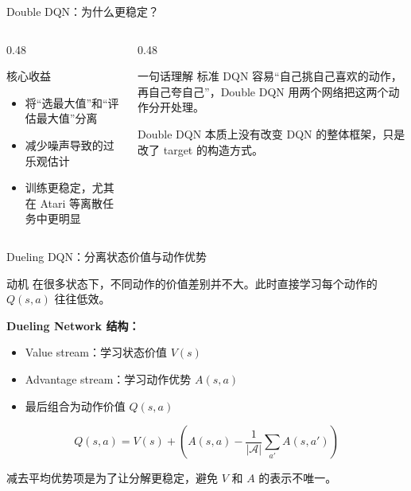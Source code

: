 \documentclass{beamer}
\begin{document}
\begin{frame}{Double DQN：为什么更稳定？}
    \begin{columns}[T]
        \begin{column}{0.48\textwidth}
            \begin{block}{核心收益}
                \begin{itemize}
                    \item 将“选最大值”和“评估最大值”分离
                    \item 减少噪声导致的过乐观估计
                    \item 训练更稳定，尤其在 Atari 等离散任务中更明显
                \end{itemize}
            \end{block}
        \end{column}
        \begin{column}{0.48\textwidth}
            \begin{block}{一句话理解}
                标准 DQN 容易“自己挑自己喜欢的动作，再自己夸自己”，Double DQN 用两个网络把这两个动作分开处理。
            \end{block}
            \vspace{0.15cm}
            {\small Double DQN 本质上没有改变 DQN 的整体框架，只是改了 target 的构造方式。}
        \end{column}
    \end{columns}
\end{frame}

\begin{frame}{Dueling DQN：分离状态价值与动作优势}
    \begin{block}{动机}
        在很多状态下，不同动作的价值差别并不大。此时直接学习每个动作的 $Q(s,a)$ 往往低效。
    \end{block}

    \textbf{Dueling Network 结构：}
    \begin{itemize}
        \item Value stream：学习状态价值 $V(s)$
        \item Advantage stream：学习动作优势 $A(s,a)$
        \item 最后组合为动作价值 $Q(s,a)$
    \end{itemize}

    \[
    Q(s,a) = V(s) + \left( A(s,a) - \frac{1}{|\mathcal{A}|}\sum_{a'} A(s,a') \right)
    \]

    {\small 减去平均优势项是为了让分解更稳定，避免 $V$ 和 $A$ 的表示不唯一。}
\end{frame}
\end{document}
